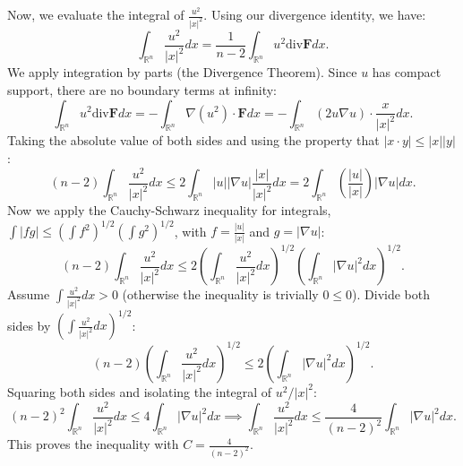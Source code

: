 \begin{solution}
Now, we evaluate the integral of $\frac{u^2}{|x|^2}$. Using our divergence identity, we have:
\[
\int_{\mathbb{R}^n} \frac{u^2}{|x|^2} dx = \frac{1}{n-2} \int_{\mathbb{R}^n} u^2 \text{div} \mathbf{F} dx.
\]
We apply integration by parts (the Divergence Theorem). Since $u$ has compact support, there are no boundary terms at infinity:
\[
\int_{\mathbb{R}^n} u^2 \text{div} \mathbf{F} dx = - \int_{\mathbb{R}^n} \nabla(u^2) \cdot \mathbf{F} dx = - \int_{\mathbb{R}^n} (2u \nabla u) \cdot \frac{x}{|x|^2} dx.
\]
Taking the absolute value of both sides and using the property that $|x \cdot y| \leq |x||y|$:
\[
(n-2) \int_{\mathbb{R}^n} \frac{u^2}{|x|^2} dx \leq 2 \int_{\mathbb{R}^n} |u| |\nabla u| \frac{|x|}{|x|^2} dx = 2 \int_{\mathbb{R}^n} \left( \frac{|u|}{|x|} \right) |\nabla u| dx.
\]
Now we apply the Cauchy-Schwarz inequality for integrals, $\int |fg| \leq \left(\int f^2\right)^{1/2} \left(\int g^2\right)^{1/2}$, with $f = \frac{|u|}{|x|}$ and $g = |\nabla u|$:
\[
(n-2) \int_{\mathbb{R}^n} \frac{u^2}{|x|^2} dx \leq 2 \left( \int_{\mathbb{R}^n} \frac{u^2}{|x|^2} dx \right)^{1/2} \left( \int_{\mathbb{R}^n} |\nabla u|^2 dx \right)^{1/2}.
\]
Assume $\int \frac{u^2}{|x|^2} dx > 0$ (otherwise the inequality is trivially $0 \leq 0$). Divide both sides by $\left( \int \frac{u^2}{|x|^2} dx \right)^{1/2}$:
\[
(n-2) \left( \int_{\mathbb{R}^n} \frac{u^2}{|x|^2} dx \right)^{1/2} \leq 2 \left( \int_{\mathbb{R}^n} |\nabla u|^2 dx \right)^{1/2}.
\]
Squaring both sides and isolating the integral of $u^2/|x|^2$:
\[
(n-2)^2 \int_{\mathbb{R}^n} \frac{u^2}{|x|^2} dx \leq 4 \int_{\mathbb{R}^n} |\nabla u|^2 dx \implies \int_{\mathbb{R}^n} \frac{u^2}{|x|^2} dx \leq \frac{4}{(n-2)^2} \int_{\mathbb{R}^n} |\nabla u|^2 dx.
\]
This proves the inequality with $C = \frac{4}{(n-2)^2}$.


\end{solution}
